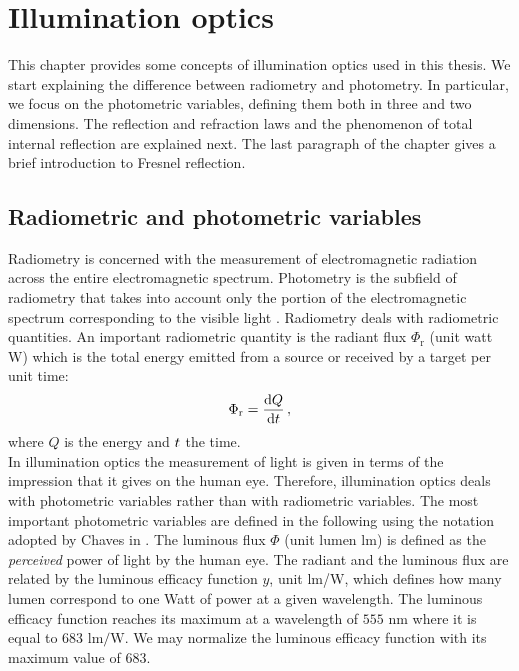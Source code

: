 \chapter{Illumination optics}\label{chap:Illumination optics}
This chapter provides some concepts of illumination optics used in this thesis. We start explaining the difference between radiometry and photometry.
In particular, we focus on the photometric variables, defining them both in three and two dimensions. The reflection and refraction laws and the phenomenon of total internal reflection are explained next. The last paragraph of the chapter gives a brief introduction to Fresnel reflection. 
\section{Radiometric and photometric variables}\label{sec:photometry}
Radiometry is concerned with the measurement of electromagnetic radiation across the entire electromagnetic spectrum. Photometry is the subfield of radiometry that takes into account only the portion of the electromagnetic spectrum corresponding to the visible light \cite{zalewski1995radiometry}. Radiometry deals with radiometric quantities. An important radiometric quantity  is the radiant flux $\Phi_{\textrm{r}}$ (unit watt \textrm{W}) which is the total energy emitted from a source or received by a target per unit time:
\begin{equation}
\Phi_{\textrm{r}} = \frac{\textrm{d}Q}{\textrm{d}t}\,,
\end{equation}
where $Q$ is the energy and $t$ the time.\\
\indent In illumination optics the measurement of light is given in terms of the impression that it gives on the human eye. Therefore, illumination optics deals with photometric variables rather than with radiometric variables. The most important photometric variables are defined in the following using the notation adopted by Chaves in \cite{chaves2015introduction}. The luminous flux $\Phi$ (unit lumen \textrm{lm}) is defined as the \textit{perceived} power of light by the human eye.
 The radiant and the luminous flux are related by the luminous efficacy function $y$, unit \textrm{lm}/\textrm{W}, which defines how many lumen correspond to one Watt of power at a given wavelength.
 The luminous efficacy function reaches its maximum  at a wavelength of $555$ $\textrm{nm}$ where it is equal to $683$ $\textrm{lm}/\textrm{W}$.
  We may normalize the luminous efficacy function with its maximum value of $683$.
